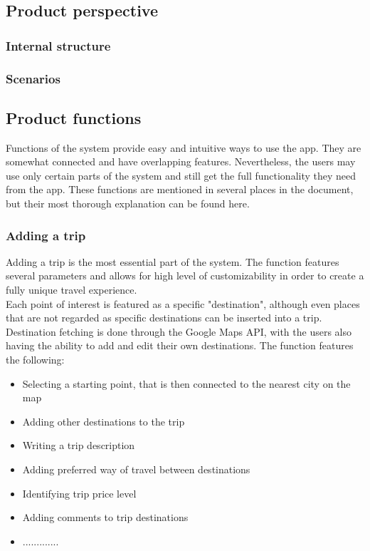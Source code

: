 \subsection{Product perspective}
\subsubsection{Internal structure}
\subsubsection{Scenarios}
\subsection{Product functions}
\hspace{\parindent}Functions of the system provide easy and intuitive ways to use the app. They are somewhat connected and have overlapping features. Nevertheless, the users may use only certain parts of the system and still get the full functionality they need from the app.
These functions are mentioned in several places in the document, but their most thorough explanation can be found here.
\subsubsection{Adding a trip}
\hspace{\parindent}Adding a trip is the most essential part of the system. The function features several parameters and allows for high level of customizability in order to create a fully unique travel experience. \\
Each point of interest is featured as a specific "destination", although even places that are not regarded as specific destinations can be inserted into a trip. Destination fetching is done through the Google Maps API, with the users also having the ability to add and edit their own destinations.
The function features the following:
\begin{itemize}
\item Selecting a starting point, that is then connected to the nearest city on the map
\item Adding other destinations to the trip
\item Writing a trip description
\item Adding preferred way of travel between destinations
\item Identifying trip price level
\item Adding comments to trip destinations
\item .............
\end{itemize}
